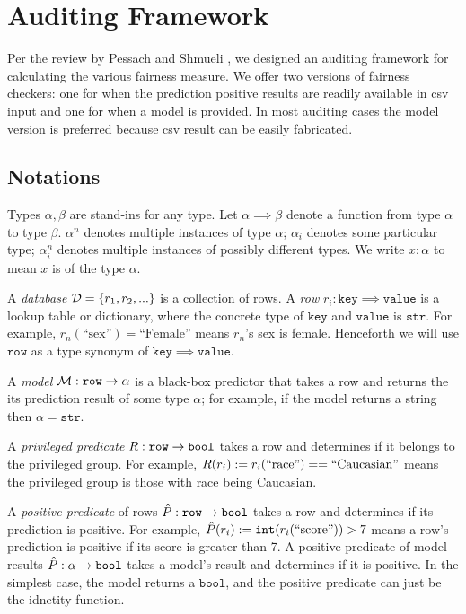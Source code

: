 \documentclass[conference]{IEEEtran}
\begin{document}
\section{Auditing Framework}
\label{sec:framework}
Per the review by Pessach and Shmueli \cite{pessach2022review}, we designed an auditing framework for calculating the various fairness measure. We offer two versions of fairness checkers: one for when the prediction positive results are readily available in csv input and one for when a model is provided. In most auditing cases the model version is preferred because csv result can be easily fabricated.

\subsection{Notations}
Types $\alpha,\beta$ are stand-ins for any type. Let $\alpha \implies \beta$ denote a function from type $\alpha$ to type $\beta$. $\alpha^n$ denotes multiple instances of type $\alpha$; $\alpha_i$ denotes some particular type; $\alpha_i^n$ denotes multiple instances of possibly different types. We write $x : \alpha$ to mean $x$ is of the type $\alpha$.

A \emph{database} $\mathcal{D} = \{r_1, r_2, ...\}$ is a collection of rows. A \emph{row} $r_i : \mathtt{key} \implies \mathtt{value}$ is a lookup table or dictionary, where the concrete type of $\mathtt{key}$ and $\mathtt{value}$ is $\mathtt{str}$. For example, $r_n(\text{``sex''}) = \text{``Female''}$ means $r_n$'s sex is female. Henceforth we will use $\mathtt{row}$ as a type synonym of $\mathtt{key} \implies \mathtt{value}$.

A \emph{model} $\mathcal{M} : \mathtt{row} \rightarrow \alpha$ is a black-box predictor that takes a row and returns the its prediction result of some type $\alpha$; for example, if the model returns a string then $\alpha = \mathtt{str}$.

A \emph{privileged predicate} $R : \mathtt{row} \rightarrow \mathtt{bool}$ takes a row and determines if it belongs to the privileged group. For example, $R(r_i) := r_i(\text{``race''}) == \text{``Caucasian''}$ means the privileged group is those with race being Caucasian.

A \emph{positive predicate} of rows $\hat{P} : \mathtt{row} \rightarrow \mathtt{bool}$ takes a row and determines if its prediction is positive. For example, $\hat{P}(r_i) := \mathtt{int}(r_i(\text{``score''})) > 7$ means a row's prediction is positive if its score is greater than 7. A positive predicate of model results $\hat{P} : \alpha \rightarrow \mathtt{bool}$ takes a model's result and determines if it is positive. In the simplest case, the model returns a $\mathtt{bool}$, and the positive predicate can just be the idnetity function.
\end{document}
